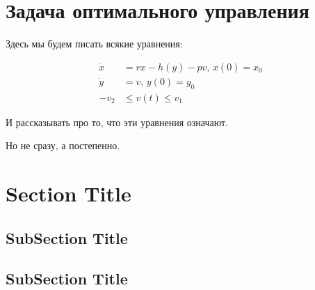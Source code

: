 \section{Задача оптимального управления}

Здесь мы будем писать всякие уравнения:

\begin{align}
    \Dot{x} & = r x - h(y) - p v,\, x(0) = x_{0} \\
    \Dot{y} & = v, \, y(0) = y_{0} \\
    - v_2 & \le v(t) \le v_1
\end{align}

И рассказывать про то, что эти уравнения означают.

Но не сразу, а постепенно.




\section{Section Title}



\subsection{SubSection Title}


\subsection{SubSection Title}
